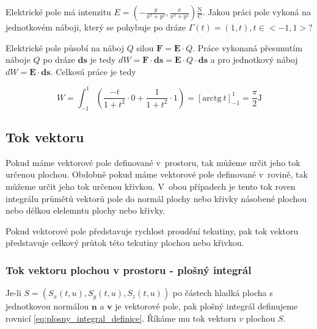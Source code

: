 \documentclass{book}
\newcommand{\vect}[1]{\boldsymbol{#1}}
\begin{document}
Elektrické pole má intenzitu \(E = \left(-\frac{y}{x^2+y^2}, \frac{x}{x^2+y^2}\right) \frac{\mathrm{N}}{\mathrm{C}}\). Jakou práci pole vykoná na jednotkovém náboji, který se pohybuje po dráze \(\Gamma(t) = (1, t), t \in <-1, 1>\)?




Elektrické pole působí na náboj \(Q\) silou \(\vect{F} = \vect{E} \cdot Q\). Práce vykonaná přesunutím náboje \(Q\) po dráze \(\vect{ds}\) je tedy \(dW = \vect{F} \cdot \vect{ds} = \vect{E} \cdot Q \cdot \vect{ds}\) a pro jednotkový náboj \(dW = \vect{E} \cdot \vect{ds}\). Celková práce je tedy

\[
W = \int_{-1}^1 \left (\frac{-t}{1 + t^2} \cdot 0 + \frac{1}{1 + t^2} \cdot 1 \right) = \left[\mathrm{arctg} \ t\right]_{-1}^1 = \frac{\pi}{2} \mathrm{J}
\]

\subsection{Tok vektoru}

Pokud máme vektorové pole definované v~prostoru, tak můžeme určit jeho tok určenou plochou. Obdobně pokud máme vektorové pole definované
 v~rovině, tak můžeme určit jeho tok určenou křivkou. V~obou případech je tento tok roven integrálu průmětů vektorů pole do normál plochy nebo křivky násobené plochou nebo délkou elelemntu plochy nebo křivky.
 
Pokud vektorové pole představuje rychlost proudění tekutiny, pak tok vektoru představuje celkový průtok této tekutiny plochou nebo křivkou.

\subsubsection{Tok vektoru plochou v prostoru - plošný integrál}

Je-li \(S = \left(S_x(t, u), S_y(t, u), S_z(t, u)\right)\) po částech hladká plocha s jednotkovou normálou \(\vect{n}\) a \(\vect{v}\) je vektorové pole,
pak plošný integrál definujeme rovnicí \eqref{eq:plosny_integral_definice}. Říkáme mu tok vektoru \(v\) plochou \(S\).
\end{document}
